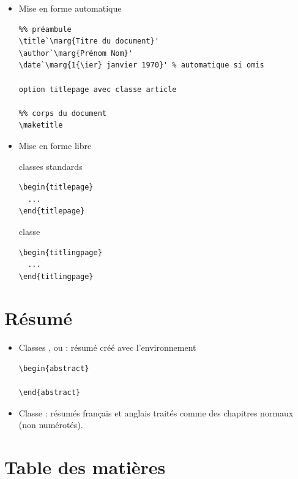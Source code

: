 \begin{itemize}
\item Mise en forme automatique
\begin{lstlisting}
%% préambule
\title`\marg{Titre du document}'
\author`\marg{Prénom Nom}'
\date`\marg{1{\ier} janvier 1970}' % automatique si omis

option titlepage avec classe article

%% corps du document
\maketitle
\end{lstlisting}
\item Mise en forme libre
  \begin{minipage}{0.45\linewidth}
    classes standards
\begin{lstlisting}
\begin{titlepage}
  ...
\end{titlepage}
\end{lstlisting}
  \end{minipage}
  \hfill
  \begin{minipage}{0.45\linewidth}
    classe 
\begin{lstlisting}
\begin{titlingpage}
  ...
\end{titlingpage}
\end{lstlisting}
  \end{minipage}
\end{itemize}

\section{Résumé}

\begin{itemize}
\item Classes ,  ou :
  résumé créé avec l'environnement
\begin{lstlisting}
\begin{abstract}

\end{abstract}
\end{lstlisting}
\item Classe : résumés français et anglais traités
  comme des chapitres normaux (non numérotés).
\end{itemize}


\section{Table des matières}

